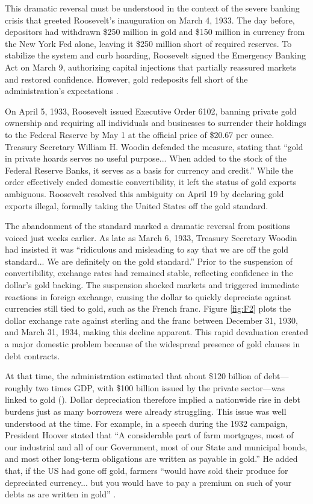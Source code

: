 This dramatic reversal must be understood in the context of the severe banking crisis that greeted Roosevelt's inauguration on March 4, 1933. The day before, depositors had withdrawn \$250 million in gold and \$150 million in currency from the New York Fed alone, leaving it \$250 million short of required reserves. To stabilize the system and curb hoarding, Roosevelt signed the Emergency Banking Act on March 9, authorizing capital injections that partially reassured markets and restored confidence. However, gold redeposits fell short of the administration's expectations \citep{Edwards2018}.

On April 5, 1933, Roosevelt issued Executive Order 6102, banning private gold ownership and requiring all individuals and businesses to surrender their holdings to the Federal Reserve by May 1 at the official price of \$20.67 per ounce. Treasury Secretary William H. Woodin defended the measure, stating that ``gold in private hoards serves no useful purpose... When added to the stock of the Federal Reserve Banks, it serves as a basis for currency and credit.'' While the order effectively ended domestic convertibility, it left the status of gold exports ambiguous. Roosevelt resolved this ambiguity on April 19 by declaring gold exports illegal, formally taking the United States off the gold standard.

The abandonment of the standard marked a dramatic reversal from positions voiced just weeks earlier. As late as March 6, 1933, Treasury Secretary Woodin had insisted it was ``ridiculous and misleading to say that we are off the gold standard... We are definitely on the gold standard.'' Prior to the suspension of convertibility, exchange rates had remained stable, reflecting confidence in the dollar's gold backing. The suspension shocked markets and triggered immediate reactions in foreign exchange, causing the dollar to quickly depreciate against currencies still tied to gold, such as the French franc. Figure \ref{fig:F2} plots the dollar exchange rate against sterling and the franc between December 31, 1930, and March 31, 1934, making this decline apparent. This rapid devaluation created a major domestic problem because of the widespread presence of gold clauses in debt contracts.

At that time, the administration estimated that about \$120 billion of debt---roughly two times GDP, with \$100 billion issued by the private sector---was linked to gold (\cite{Edwards2015}). Dollar depreciation therefore implied a nationwide rise in debt burdens just as many borrowers were already struggling. This issue was well understood at the time. For example, in a speech during the 1932 campaign, President Hoover stated that ``A considerable part of farm mortgages, most of our industrial and all of our Government, most of our State and municipal bonds, and most other long-term obligations are written as payable in gold.'' He added that, if the US had gone off gold, farmers ``would have sold their produce for depreciated currency... but you would have to pay a premium on such of your debts as are written in gold'' \citep{Hoover1932}.

